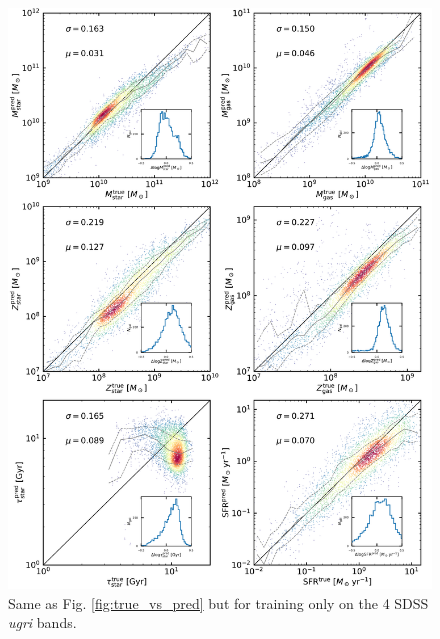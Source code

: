 \documentclass[useAMS,usenatbib]{mnras}
\begin{document}
\begin{figure}
\vspace{-.4cm}
\begin{center}
\includegraphics[height=.5\textheight]{./plots/predicted_vs_true_all_masked_log_ugri.pdf}
\end{center}
\vspace{-.5cm}
\caption{Same as Fig. \ref{fig:true_vs_pred} but for training only on the 4 SDSS \textit{ugri} bands.}
\label{fig:true_vs_pred2}
\end{figure}
\end{document}
